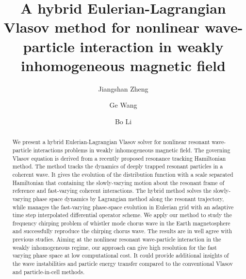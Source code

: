\documentclass[times,12pt,3p,longtitle]{elsarticle}
\begin{document}
\begin{frontmatter}
\title{A hybrid Eulerian-Lagrangian Vlasov method for nonlinear wave-particle interaction in weakly inhomogeneous magnetic field}
\author[1]{Jiangshan Zheng}

\author[2]{Ge Wang}
\author[1]{Bo Li}
\address[1]{School of Physics, Beihang University, Beijing, Beijing 100191, China}
\address[2]{Institute for Fusion Studies, The University of Texas, Austin, Texas, 78712, USA}
\begin{abstract}
  We present a hybrid Eulerian-Lagrangian Vlasov solver for nonlinear resonant wave-particle interactions problems in weakly inhomogeneous magnetic field.
  The governing Vlasov equation is derived from a recently proposed resonance tracking Hamiltonian method. 
  The method tracks the dynamics of deeply trapped resonant particles in a coherent wave. 
  It gives the evolution of the distribution function with a scale separated Hamiltonian that containing the slowly-varying motion about the resonant frame of reference and fast-varying coherent interactions.
  The hybrid method solves the slowly-varying phase space dynamics by Lagrangian method along the resonant trajectory, while manages the fast-varying phase-space evolution in Eulerian grid with an adaptive time step interpolated differential operator scheme.
  We apply our method to study the frequency chirping problem of whistler mode chorus wave in the Earth magnetosphere and successfully reproduce the chirping chorus wave. 
  The results are in well agree with previous studies. 
  Aiming at the nonlinear resonant wave-particle interaction in the weakly inhomogeneous regime, our approach can give high resolution for the fast varying phase space at low computational cost.  
  It could provide additional insights of the wave instabilities and particle energy transfer compared to the conventional Vlasov and particle-in-cell methods.
\end{abstract}
\end{frontmatter}
\end{document}
